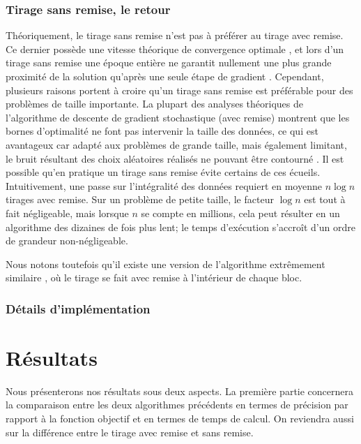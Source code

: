 \documentclass[10pt,a4paper]{article}
\begin{document}
\subsubsection*{Tirage sans remise, le retour}
Théoriquement, le tirage sans remise n'est pas à préférer au tirage avec remise. Ce dernier possède une vitesse théorique de convergence optimale \cite{jelly}\cite{bottou}, et lors d'un tirage sans remise une époque entière ne garantit nullement une plus grande proximité de la solution qu'après une seule étape de gradient \cite{nedic}. Cependant, plusieurs raisons portent à croire qu'un tirage sans remise est préférable pour des problèmes de taille importante. La plupart des analyses théoriques de l'algorithme de descente de gradient stochastique (avec remise) montrent que les bornes d'optimalité ne font pas intervenir la taille des données, ce qui est avantageux car adapté aux problèmes de grande taille, mais également limitant, le bruit résultant des choix aléatoires réalisés ne pouvant être contourné \cite{bottou}\cite{nedic}. Il est possible qu'en pratique un tirage sans remise évite certains de ces écueils. Intuitivement, une passe sur l'intégralité des données requiert en moyenne $n \log n$ tirages avec remise. Sur un problème de petite taille, le facteur $\log n$ est tout à fait négligeable, mais lorsque $n$ se compte en millions, cela peut résulter en un algorithme des dizaines de fois plus lent; le temps d'exécution s'accroît d'un ordre de grandeur non-négligeable.

Nous notons toutefois qu'il existe une version de l'algorithme extrêmement similaire \cite{gemulla_distri}, où le tirage se fait avec remise à l'intérieur de chaque bloc.

\subsubsection*{Détails d'implémentation}




\section{Résultats}

Nous présenterons nos résultats sous deux aspects. La première partie concernera la comparaison entre les deux algorithmes précédents en termes de précision par rapport à la fonction objectif et en termes de temps de calcul. On reviendra aussi sur la différence entre le tirage avec remise et sans remise.
\end{document}
